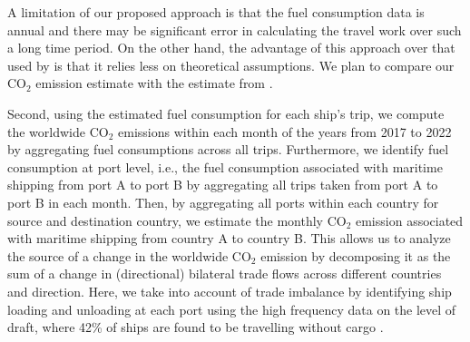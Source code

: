 \documentclass[hidelinks, 12pt,letterpaper]{article}
\begin{document}
A limitation of our proposed approach is that the fuel consumption data is annual and there may be significant error in calculating the travel work over such a long time period. On the other hand, the advantage of this approach over that used by \citet{faber2020fourth} is that it relies less on theoretical assumptions. We plan to compare our CO$_2$ emission estimate with the estimate from \citet{faber2020fourth}. %

Second, using the estimated fuel consumption for each ship's trip, we compute the worldwide CO$_2$ emissions within each month of the years from 2017 to 2022 by aggregating fuel consumptions across all trips. Furthermore, we identify fuel consumption at port level, i.e., the fuel consumption associated with maritime shipping from port A to port B by aggregating all trips taken from port A to port B in each month.  Then, by aggregating all ports within each country for source and destination country, we estimate the monthly CO$_2$ emission associated with maritime shipping from country A to country B. 
This allows us to analyze the source of  a change in the worldwide CO$_2$ emission by decomposing it as the sum of a change in (directional) bilateral trade flows across different countries and direction. 
Here, we take into account of  trade  imbalance   by identifying ship loading and unloading at each port using the high frequency data on the level of draft, where 42\% of ships are found to be travelling without cargo \citep{brancaccio2020geography}.

\end{document}
